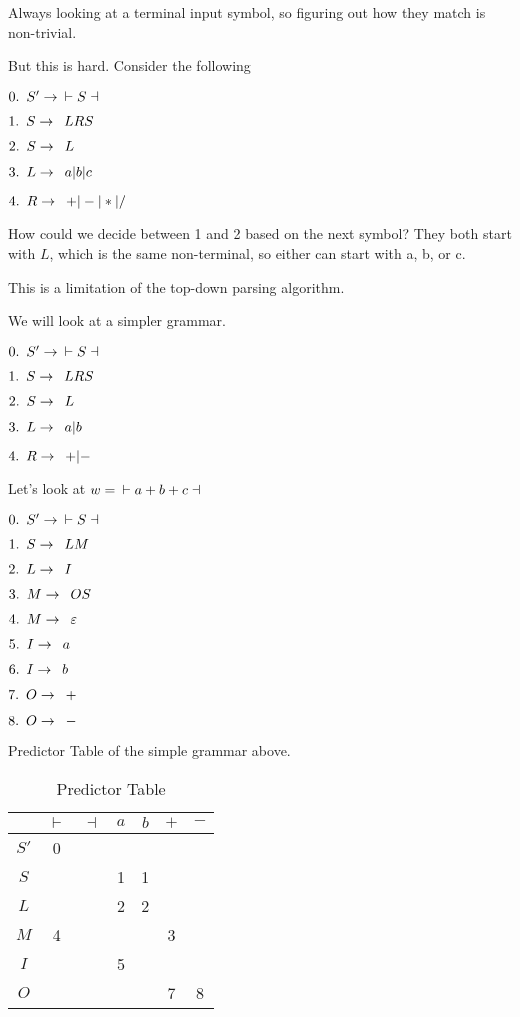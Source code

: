 \documentclass{article}
\begin{document}
Always looking at a terminal input symbol, so figuring out how they
match is non-trivial.

But this is hard. Consider the following

\(0. \mkern9mu S' \to \mkern9mu \vdash S \dashv\)

\(1. \mkern9mu S \to \mkern9mu LRS\)

\(2. \mkern9mu S \to \mkern9mu L\)

\(3. \mkern9mu L \to \mkern9mu a | b | c\)

\(4. \mkern9mu R \to \mkern9mu + | - | * | /\)

How could we decide between 1 and 2 based on the next symbol? They both
start with \(L\), which is the same non-terminal, so either can start
with a, b, or c.~

This is a limitation of the top-down parsing algorithm.

We will look at a simpler grammar.

\(0. \mkern9mu S' \to \mkern9mu \vdash S \dashv\)

\(1. \mkern9mu S \to \mkern9mu LRS\)

\(2. \mkern9mu S \to \mkern9mu L\)

\(3. \mkern9mu L \to \mkern9mu a | b\)

\(4. \mkern9mu R \to \mkern9mu + | -\)

Let's look at \(w = \mkern9mu \vdash a + b + c \dashv\)


\(0. \mkern9mu S' \to \mkern9mu \vdash S \dashv\)

\(1. \mkern9mu S \to \mkern9mu L M\)

\(2. \mkern9mu L \to \mkern9mu I\)

\(3. \mkern9mu M \to \mkern9mu OS\)

\(4. \mkern9mu M \to \mkern9mu \varepsilon\)

\(5. \mkern9mu I \to \mkern9mu a\)

\(6. \mkern9mu I \to \mkern9mu b\)

\(7. \mkern9mu O \to \mkern9mu +\)

\(8. \mkern9mu O \to \mkern9mu -\)


Predictor Table of the simple grammar above.


\begin{table}[h]
    \centering
    \begin{tabular}{|c|c|c|c|c|c|c|} \hline 
         &  $\vdash$&  $\dashv$&  $a$&  $b$&  $+$& $-$\\ \hline 
         $S'$&  0&  &  &  &  & \\ \hline 
         $S$&  &  &  1&  1&  & \\ \hline 
         $L$&  &  &  2&  2&  & \\ \hline 
         $M$&  4&  &  &  &  3& \\ \hline 
         $I$&  &  &  5&  &  & \\ \hline 
 $O$& & & & & 7&8\\ \hline
    \end{tabular}
    \caption{Predictor Table}
    
\end{table}
\end{document}
